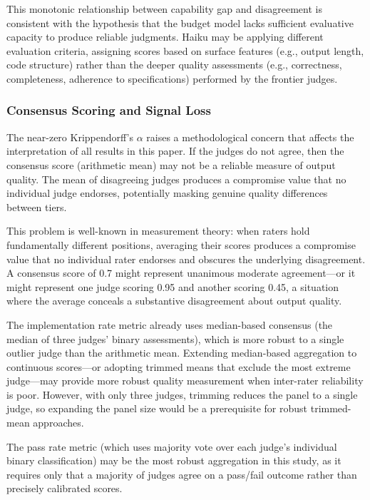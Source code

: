 \documentclass[11pt]{article}
\begin{document}
This monotonic relationship between capability gap and disagreement is
consistent with the hypothesis that the budget model lacks sufficient
evaluative capacity to produce reliable judgments. Haiku may be applying
different evaluation criteria, assigning scores based on surface features
(e.g., output length, code structure) rather than the deeper quality
assessments (e.g., correctness, completeness, adherence to specifications)
performed by the frontier judges.

\subsubsection{Consensus Scoring and Signal Loss}

The near-zero Krippendorff's $\alpha$ raises a methodological concern that
affects the interpretation of all results in this paper. If the judges do not
agree, then the consensus score (arithmetic mean) may not be a reliable
measure of output quality. The mean of disagreeing judges produces a
compromise value that no individual judge endorses, potentially masking
genuine quality differences between tiers.

This problem is well-known in measurement theory: when raters hold
fundamentally different positions, averaging their scores produces a
compromise value that no individual rater endorses and obscures the
underlying disagreement. A consensus score of 0.7 might represent unanimous
moderate agreement---or it might represent one judge scoring 0.95 and
another scoring 0.45, a situation where the average conceals a substantive
disagreement about output quality.

The implementation rate metric already uses median-based consensus (the median
of three judges' binary assessments), which is more robust to a single
outlier judge than the arithmetic mean. Extending median-based aggregation to
continuous scores---or adopting trimmed means that exclude the most extreme
judge---may provide more robust quality measurement when inter-rater
reliability is poor. However, with only three judges, trimming reduces the
panel to a single judge, so expanding the panel size would be a prerequisite
for robust trimmed-mean approaches.

The pass rate metric (which uses majority vote over each judge's individual
binary classification) may be the most robust aggregation in this study, as
it requires only that a majority of judges agree on a pass/fail outcome
rather than precisely calibrated scores.
\end{document}
